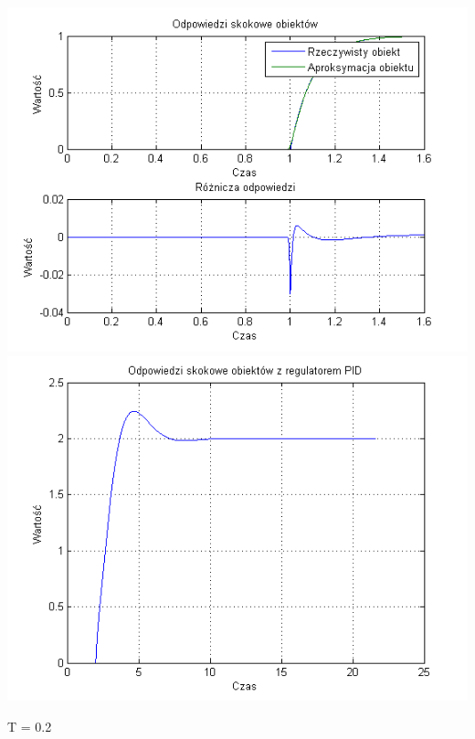 \documentclass[10pt,a4paper]{article}
\begin{document}
\begin{center}
\includegraphics[scale=1]{images/dwa/skrypt_05.png}\\
\includegraphics[scale=1]{images/dwa/skrypt_06.png}\\
\end{center}
\newpage
T = 0.2
\end{document}
